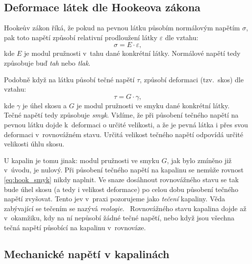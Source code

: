 \documentclass[12pt]{article}
\begin{document}
\subsection{Deformace látek dle Hookeova zákona}%
\label{sec:Hookeův_zákon}%

Hookeův zákon říká, že pokud na pevnou látku působím normálovým napětím $\sigma$, pak toto napětí způsobí relativní prodloužení látky $\varepsilon$ dle vztahu: 
\begin{equation}
    \sigma = E\cdot\varepsilon\text{,}
\end{equation}
kde $E$ je modul pružnosti v~tahu dané konkrétní látky. Normálové napětí tedy způsobuje buď \emph{tah} nebo \emph{tlak}.
\par \noindent
Podobně když na látku působí tečné napětí $\tau$, způsobí deformaci (tzv.~skos) dle vztahu: 
\begin{equation}
    \tau = G\cdot\gamma\text{,}
    \label{eq:hook_smyk}
\end{equation}
kde $\gamma$ je úhel skosu a $G$ je modul pružnosti ve smyku dané konkrétní látky.~\cite{wiki:Pružnost} Tečné napětí tedy způsobuje \emph{smyk}.
Vidíme, že při působení tečného napětí na pevnou látku dojde k~deformaci o určité velikosti, a že je pevná látka i přes svou deformaci v~rovnovážném stavu. Určitá velikost tečného napětí odpovídá určité velikosti úhlu skosu.
\par
U kapalin je tomu jinak: modul pružnosti ve smyku $G$, jak bylo zmíněno již v~úvodu, je nulový. Při působení tečného napětí na kapalinu se nemůže rovnost \ref{eq:hook_smyk} nikdy naplnit. Ve snaze dosáhnout rovnovážného stavu se tak bude úhel skosu (a tedy i velikost deformace) po celou dobu působení tečného napětí zvyšovat. Tento jev v~praxi pozorujeme jako \emph{tečení} kapaliny. Věda zabývající se tečením se nazývá \emph{reologie}.~\cite{wiki:Rheology} Rovnovážného stavu kapalina dojde až v~okamžiku, kdy na ní nepůsobí žádné tečné napětí, nebo když jsou všechna tečná napětí působící na kapalinu v~rovnováze.

\subsection{Mechanické napětí v kapalinách}%
\end{document}
